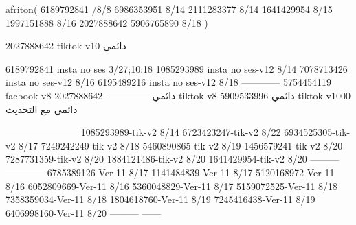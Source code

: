 afriton(
6189792841 /8/8
6986353951 8/14
2111283377 8/14
1641429954 8/15
1997151888 8/16
2027888642
5906765890 8/18
)

2027888642 tiktok-v10
دائمي

6189792841 insta no ses
3/27;10:18
1085293989 insta no ses-v12
8/14
7078713426 insta no ses-v12
8/16
6195489216 insta no ses-v12
8/18
------------
5754454119 facbook-v8
دائمي
--------------
2027888642 tiktok-v8
دائمي
5909533996 tiktok-v1000
دائمي مع التحديث

__________
1085293989-tik-v2
8/14
6723423247-tik-v2
8/22
6934525305-tik-v2
8/17
7249242249-tik-v2
8/18
5460890865-tik-v2
8/19
1456579241-tik-v2
8/20
7287731359-tik-v2
8/20
1884121486-tik-v2
8/20
1641429954-tik-v2
8/20
---------
------------
6785389126-Ver-11
8/17
1141484839-Ver-11
8/17
5120168972-Ver-11
8/16
6052809669-Ver-11
8/16
5360048829-Ver-11
8/17
5159072525-Ver-11
8/18
7358359034-Ver-11
8/18
1804618760-Ver-11
8/19
7245416438-Ver-11
8/19
6406998160-Ver-11
8/20
---------
------
